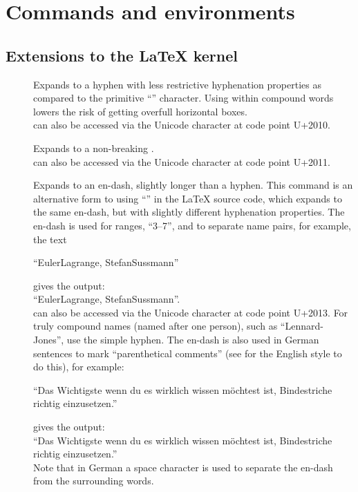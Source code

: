 

\section{Commands and environments}
\label{sec:commandsAndEnvironments}


\subsection{Extensions to the \LaTeX{} kernel}
\label{subsec:extensionsToTheLatexKernel}

\begin{description}
\item[\latexcmd{\hyphen}] \enforcenewline%
  Expands to a hyphen with less restrictive hyphenation properties as
  compared to the primitive \enquote{\latexcmd{-}} character. Using
  \latexcmd{\hyphen} within compound words lowers the risk of getting
  overfull horizontal boxes. \\
  \latexcmd{\hyphen} can also be accessed via the Unicode character at code
  point U+2010.

\item[\latexcmd{\nbhyphen}] \enforcenewline%
  Expands to a non\hyphen{}breaking \latexcmd{\hyphen}. \\
  \latexcmd{\nbhyphen} can also be accessed via the Unicode character at
  code point U+2011.

\item[\latexcmd{\textendash}] \enforcenewline%
  Expands to an en-dash, slightly longer than a hyphen. This command is an
  alternative form to using \enquote{\cmdline{--}} in the \LaTeX{} source
  code, which expands to the same en-dash, but with slightly different
  hyphenation properties. The en-dash is used for ranges, \EG{} ``3--7'',
  and to separate name pairs, for example, the text%
  \begin{CommandLineListing}[print=true, xleftmargin=0pt, gobble=4]%
    ``Euler\textendash{}Lagrange, Stefan\textendash{}Sussmann''
  \end{CommandLineListing}
  gives the output: \\
  ``Euler\textendash{}Lagrange, Stefan\textendash{}Sussmann''. \\
  \latexcmd{\textendash} can also be accessed via the Unicode character at
  code point U+2013. For truly compound names (named after one person),
  such as ``Lennard-Jones'', use the simple hyphen. The en-dash is also
  used in German sentences to mark ``parenthetical comments'' (see
  \latexcmd{\textemdash} for the English style to do this), for example:
  \begin{CommandLineListing}[print=true, xleftmargin=0pt, gobble=4]%
    ``Das Wichtigste \textendash{} wenn du es wirklich wissen m\"ochtest
    \textendash{} ist, Bindestriche richtig einzusetzen.''
  \end{CommandLineListing}
  gives the output: \\
  ``Das Wichtigste \textendash{} wenn du es wirklich wissen m\"ochtest
  \textendash{} ist, Bindestriche richtig einzusetzen.'' \\
  Note that in German a space character is used to separate the en-dash
  from the surrounding words.


\end{description}
